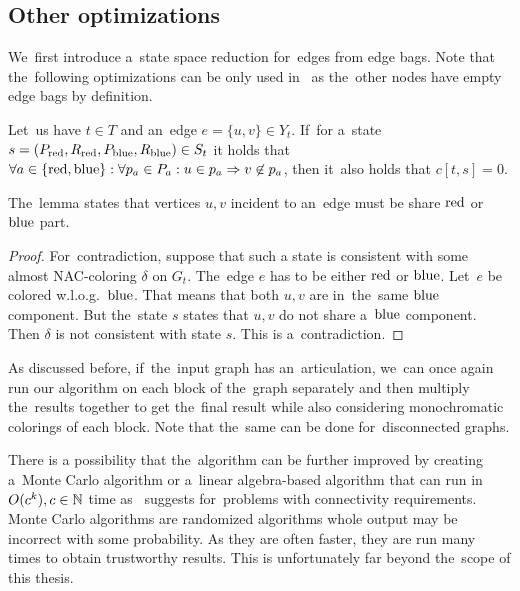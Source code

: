 \subsection{Other optimizations}

We~first introduce a~state space reduction for~edges from edge bags.
%
Note that the~following optimizations can be only used in~\IntroduceEdgeNode{}
as the~other nodes have empty edge bags by definition.
%
\begin{lemma}
	Let~us have \( t \in T \) and an~edge \( e = \{u, v\} \in Y_t \).
	If~for a~state \( s = (P_{\text{red}}, R_{\text{red}}, P_{\text{blue}}, R_{\text{blue}}) \in S_t \)
	it holds that
	\( {\forall a \in \{\text{red}, \text{blue}\}} : {\forall p_a \in P_a} : {u \in p_a \Rightarrow v \not\in p_a} \),
	then it~also holds that \( c[t, s] = 0 \).
\end{lemma}
%
The~lemma states that vertices \( u, v \) incident to an~edge must
be share \( \text{red} \) or \( \text{blue} \) part.
%
\begin{proof}
	For~contradiction, suppose that such a state is consistent
	with some almost NAC-coloring \( \delta \) on \( G_t \).
	The~edge \( e \) has to be either \( \text{red} \) or \( \text{blue} \).
	Let~\( e \) be colored w.l.o.g.\ \( \text{blue} \).
	That means that both \( u, v \) are in~the~same \( \text{blue} \) component.
	But the~state \( s \) states that \( u, v \) do not share a~\( \text{blue} \) component.
	Then \( \delta \) is not consistent with state \( s \).
	This is a~contradiction.
\end{proof}

As discussed before, if~the~input graph has an~articulation,
we~can once again run our algorithm on each block of the~graph separately
and then multiply the~results together to get the~final result
while also considering monochromatic colorings of each block.
Note that the~same can be done for~disconnected graphs.

There is a possibility that the~algorithm can be further improved by creating
a~Monte Carlo algorithm or a~linear algebra-based algorithm that can run
in~\( O(c^k), c \in \mathbb{N} \) time as~\cite{book_parametrized_algorithms} suggests
for~problems with connectivity requirements.
Monte Carlo algorithms are randomized algorithms whole output may be incorrect
with some probability. As they are often faster, they are run many times
to obtain trustworthy results.
This is unfortunately far beyond the~scope of this thesis.

